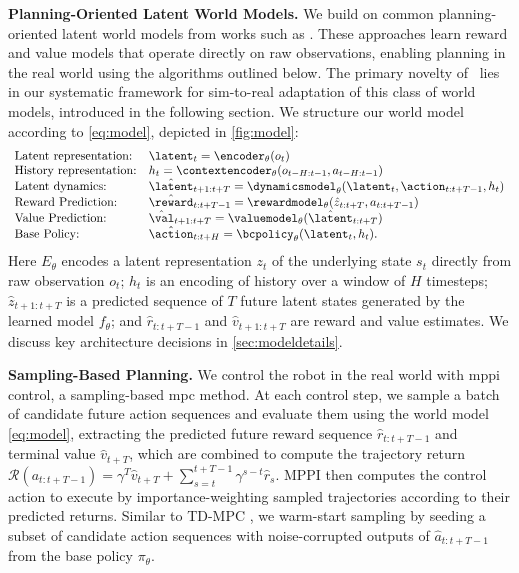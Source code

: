 \textbf{Planning-Oriented Latent World Models.} We build on common planning-oriented latent world models from works such as \cite{hansen2022temporal, hafnerdream}. These approaches learn reward and value models that operate directly on raw observations, enabling planning in the real world using the algorithms outlined below. The primary novelty of \Method \ lies in our systematic framework for sim-to-real adaptation of this class of world models, introduced in the following section. We structure our world model according to \cref{eq:model}, depicted in \cref{fig:model}:
\begin{equation}
\label{eq:model}
\begin{array}{ll}
    \text{Latent representation:} & \latent_{t} = \encoder_{\theta}(o_t)\\
    \text{History representation:} & h_t = \contextencoder_{\theta}(o_{t-H:t-1}, a_{t-H:t-1})\\
    \text{Latent dynamics:} & \hat{\latent}_{t+1:t+T} = \dynamicsmodel_{\theta}(\latent_{t}, \action_{t:t+T -1}, h_t)\\
    \text{Reward Prediction:} & \hat{\reward}_{t:t+T-1} = \rewardmodel_{\theta}(\hat{z}_{t:t+T},a_{t:t+T-1})\\
    \text{Value Prediction:} & \hat{\val}_{t+1:t+T} = \valuemodel_{\theta}(\hat{\latent}_{t:t+T})\\
    \text{Base Policy:} & \hat{\action}_{t:t+H} = \bcpolicy_{\theta}(\latent_{t}, h_t).
\end{array}
\end{equation}
Here $E_{\theta}$ encodes a latent representation $z_t$ of the underlying state $s_t$ directly from raw observation $o_t$; $h_t$ is an encoding of history over a window of $H$ timesteps; $\hat{z}_{t+1:t+T}$ is a predicted sequence of $T$ future latent states generated by the learned model $f_\theta$; and $\hat{r}_{t:t+T-1}$ and $\hat{v}_{t+1:t+T}$ are reward and value estimates. We discuss key architecture decisions in \cref{sec:modeldetails}. 

\textbf{Sampling-Based Planning.}
We control the robot in the real world with \ac{mppi} \cite{williams2016aggressive} control, a sampling-based \ac{mpc} method. At each control step, we sample a batch of candidate future action sequences and evaluate them using the world model \cref{eq:model}, extracting the predicted future reward sequence $\hat{r}_{t:t+T-1}$ and terminal value $\hat{v}_{t+T}$, which are combined to compute the trajectory return \mbox{$\mathcal{R}(a_{t:t+T-1}) = \gamma^T\hat{v}_{t+T} + \sum_{s=t}^{t+T-1} \gamma^{s-t}\hat{r}_s$}.
MPPI then computes the control action to execute by importance-weighting sampled trajectories according to their predicted returns. Similar to TD-MPC \cite{hansen2022temporal}, we warm-start sampling by seeding a subset of candidate action sequences with noise-corrupted outputs of $\hat{a}_{t:t+T-1}$ from the base policy $\pi_\theta$.


